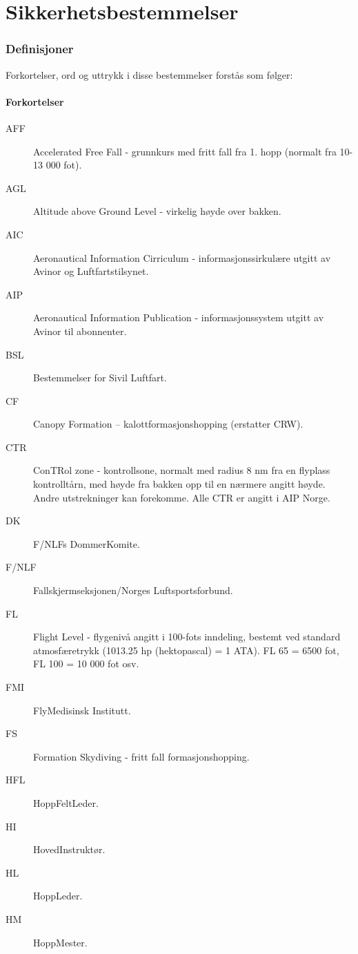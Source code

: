 \part{Sikkerhetsbestemmelser}
\setcounter{section}{99}

\section{Definisjoner}
Forkortelser, ord og uttrykk i disse bestemmelser forstås som følger:

\subsection{Forkortelser}
\begin{description}
	\item[AFF]	Accelerated Free Fall - grunnkurs med fritt fall fra 1. hopp (normalt fra 10-13 000 fot).
	\item[AGL]	Altitude above Ground Level - virkelig høyde over bakken.
	\item[AIC]	Aeronautical Information Cirriculum - informasjonssirkulære utgitt av Avinor og Luftfartstilsynet.
	\item[AIP]	Aeronautical Information Publication - informasjonssystem utgitt av Avinor til abonnenter.
	\item[BSL]	Bestemmelser for Sivil Luftfart.
	\item[CF]	Canopy Formation – kalottformasjonshopping (erstatter CRW).
	\item[CTR]	ConTRol zone - kontrollsone, normalt med radius 8 nm fra en flyplass kontrolltårn, med høyde fra bakken opp til en nærmere angitt høyde. Andre utstrekninger kan forekomme. Alle CTR er angitt i AIP Norge.
	\item[DK]	F/NLFs DommerKomite.
	\item[F/NLF]	Fallskjermseksjonen/Norges Luftsportsforbund.
	\item[FL]	Flight Level - flygenivå angitt i 100-fots inndeling, bestemt ved standard atmosfæretrykk (1013.25 hp (hektopascal) = 1 ATA). FL 65 = 6500 fot, FL 100 = 10 000 fot osv.
	\item[FMI]	FlyMedisinsk Institutt.
	\item[FS]	Formation Skydiving - fritt fall formasjonshopping.
	\item[HFL]	HoppFeltLeder.
	\item[HI]	HovedInstruktør.
	\item[HL]	HoppLeder.
	\item[HM]	HoppMester.

\end{description}
